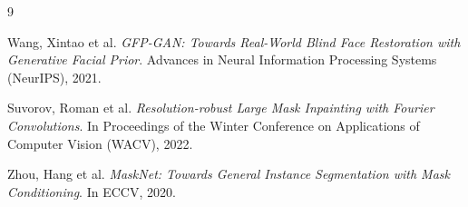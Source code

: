\documentclass[12pt,a4paper]{article}
\begin{document}
	\begin{thebibliography}{9}
		
		Wang, Xintao et al.
		\textit{GFP-GAN: Towards Real-World Blind Face Restoration with Generative Facial Prior}.
		Advances in Neural Information Processing Systems (NeurIPS), 2021.
		
		Suvorov, Roman et al.
		\textit{Resolution-robust Large Mask Inpainting with Fourier Convolutions}.
		In Proceedings of the Winter Conference on Applications of Computer Vision (WACV), 2022.
		
		Zhou, Hang et al.
		\textit{MaskNet: Towards General Instance Segmentation with Mask Conditioning}.
		In ECCV, 2020.
		
	\end{thebibliography}
\end{document}
